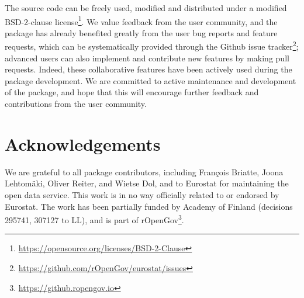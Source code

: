 The source code can be freely used, modified and distributed under a modified BSD-2-clause license\footnote{\url{https://opensource.org/licenses/BSD-2-Clause}}. We value feedback from the user community, and the package has already benefited greatly from the user bug reports and feature requests, which can be systematically provided through the Github issue tracker\footnote{\url{https://github.com/rOpenGov/eurostat/issues}}; advanced users can also implement and contribute new features by making pull requests. Indeed, these collaborative features have been actively used during the package development. We are committed to active maintenance and development of the package, and hope that this will encourage further feedback and contributions from the user community.


\section*{Acknowledgements}

We are grateful to all package contributors, including Fran\c{c}ois Briatte, Joona Lehtom{\"a}ki, Oliver Reiter, and Wietse Dol, and to Eurostat for maintaining the open data service. This work is in no way officially related to or endorsed by Eurostat. The work has been partially funded by Academy of Finland (decisions 295741, 307127 to LL), and is part of rOpenGov\footnote{\url{https://github.ropengov.io}}.




\address{Leo Lahti\\
  Department of Mathematics and Statistics\\
  PO Box 20014 University of Turku\\
  Finland\\
  ORCiD: 0000-0001-5537-637X\\
  }

\address{Janne Huovari\\
  Pellervo Economic Research PTT\\
  Eerikinkatu 28 A, 00180 Helsinki\\
  Finland\\
  }

\address{Markus Kainu\\
  Research Department, The Social Insurance Institution of Finland\\
  PO Box 450, 00101 Helsinki\\
  Finland\\
  }

